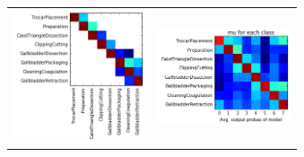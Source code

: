 \documentclass[landscape,a0paper,fontscale=0.292]{baposter}
\begin{document}
\begin{poster}
{

\begin{tabular}{cc}
\hspace{-3mm} \includegraphics[width=3.9cm]{../slides/images/index.png} & \hspace{-4mm} \includegraphics[width=3.9cm]{../slides/images/index2.png} \\
\end{tabular}


}

%
%
%
%
%
%
%



\end{poster}
\end{document}
